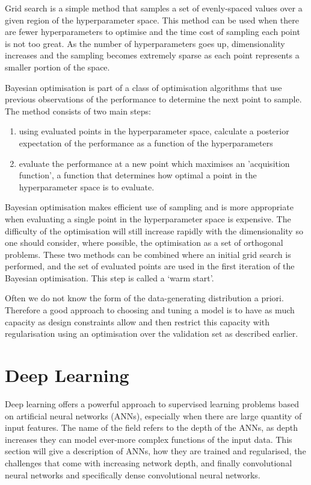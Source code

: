 Grid search is a simple method that samples a set of evenly-spaced values over a given region of the hyperparameter space. 
This method can be used when there are fewer hyperparameters to optimise and the time cost of sampling each point is not too great. 
As the number of hyperparameters goes up, dimensionality increases and the sampling becomes extremely sparse as each point represents a smaller portion of the space.

Bayesian optimisation \cite{BayesOpt} is part of a class of optimisation algorithms that use previous observations of the performance to determine the next point to sample. 
The method consists of two main steps:
\begin{enumerate}[leftmargin=.5in,noitemsep]
    \item using evaluated points in the hyperparameter space, calculate a posterior expectation of the performance as a function of the hyperparameters
    \item evaluate the performance at a new point which maximises an 'acquisition function', a function that determines how optimal a point in the hyperparameter space is to evaluate. 
\end{enumerate}
Bayesian optimisation makes efficient use of sampling and is more appropriate when evaluating a single point in the hyperparameter space is expensive. The difficulty of the optimisation will still increase rapidly with the dimensionality so one should consider, where possible, the optimisation as a set of orthogonal problems.  
These two methods can be combined where an initial grid search is performed, and the set of evaluated points are used in the first iteration of the Bayesian optimisation. 
This step is called a `warm start'. 

Often we do not know the form of the data-generating distribution a priori. Therefore a good approach to choosing and tuning a model is to have as much capacity as design constraints allow and then restrict this capacity with regularisation using an optimisation over the validation set as described earlier.

\section{Deep Learning}

Deep learning offers a powerful approach to supervised learning problems based on artificial neural networks (ANNs), especially when there are large quantity of input features. 
The name of the field refers to the depth of the ANNs, as depth increases they can model ever-more complex functions of the input data. 
This section will give a description of ANNs, how they are trained and regularised, the challenges that come with increasing network depth, and finally convolutional neural networks and specifically dense convolutional neural networks.  

